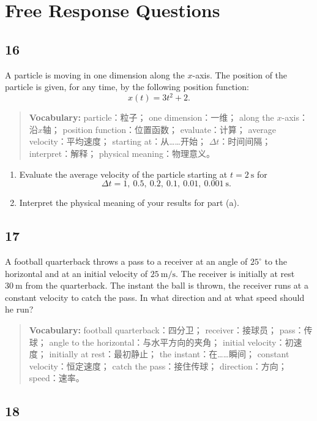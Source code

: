 \documentclass[12pt,a4paper]{article}
\newcommand{\vocab}[1]{
\begin{quote}
\small
\textbf{Vocabulary:} #1
\end{quote}
}
\begin{document}
\newpage

\section*{Free Response Questions}

\subsection*{16 \quad [12 points]}

A particle is moving in one dimension along the $x$-axis. The position of the particle is given, for any time, by the following position function:
\[
x(t)=3t^2+2.
\]

\vocab{
particle：粒子；
one dimension：一维；
along the $x$-axis：沿$x$轴；
position function：位置函数；
evaluate：计算；
average velocity：平均速度；
starting at：从……开始；
$\Delta t$：时间间隔；
interpret：解释；
physical meaning：物理意义。
}

\begin{enumerate}[label=(\alph*)]
    \item Evaluate the average velocity of the particle starting at $t=2\ \text{s}$ for
    \[
    \Delta t=1,\ 0.5,\ 0.2,\ 0.1,\ 0.01,\ 0.001\ \text{s}.
    \]
    \item Interpret the physical meaning of your results for part (a).
\end{enumerate}

\subsection*{17 \quad [12 points]}

A football quarterback throws a pass to a receiver at an angle of $25^\circ$ to the horizontal and at an initial velocity of $25\ \text{m/s}$. The receiver is initially at rest $30\ \text{m}$ from the quarterback. The instant the ball is thrown, the receiver runs at a constant velocity to catch the pass. In what direction and at what speed should he run?

\vocab{
football quarterback：四分卫；
receiver：接球员；
pass：传球；
angle to the horizontal：与水平方向的夹角；
initial velocity：初速度；
initially at rest：最初静止；
the instant：在……瞬间；
constant velocity：恒定速度；
catch the pass：接住传球；
direction：方向；
speed：速率。
}

\subsection*{18 \quad [16 points]}
\end{document}
